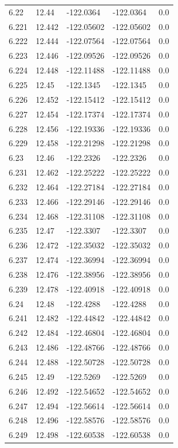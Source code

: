 \begin{tabular}{lllll}
6.22 & 12.44 & -122.0364 & -122.0364 & 0.0 \\
6.221 & 12.442 & -122.05602 & -122.05602 & 0.0 \\
6.222 & 12.444 & -122.07564 & -122.07564 & 0.0 \\
6.223 & 12.446 & -122.09526 & -122.09526 & 0.0 \\
6.224 & 12.448 & -122.11488 & -122.11488 & 0.0 \\
6.225 & 12.45 & -122.1345 & -122.1345 & 0.0 \\
6.226 & 12.452 & -122.15412 & -122.15412 & 0.0 \\
6.227 & 12.454 & -122.17374 & -122.17374 & 0.0 \\
6.228 & 12.456 & -122.19336 & -122.19336 & 0.0 \\
6.229 & 12.458 & -122.21298 & -122.21298 & 0.0 \\
6.23 & 12.46 & -122.2326 & -122.2326 & 0.0 \\
6.231 & 12.462 & -122.25222 & -122.25222 & 0.0 \\
6.232 & 12.464 & -122.27184 & -122.27184 & 0.0 \\
6.233 & 12.466 & -122.29146 & -122.29146 & 0.0 \\
6.234 & 12.468 & -122.31108 & -122.31108 & 0.0 \\
6.235 & 12.47 & -122.3307 & -122.3307 & 0.0 \\
6.236 & 12.472 & -122.35032 & -122.35032 & 0.0 \\
6.237 & 12.474 & -122.36994 & -122.36994 & 0.0 \\
6.238 & 12.476 & -122.38956 & -122.38956 & 0.0 \\
6.239 & 12.478 & -122.40918 & -122.40918 & 0.0 \\
6.24 & 12.48 & -122.4288 & -122.4288 & 0.0 \\
6.241 & 12.482 & -122.44842 & -122.44842 & 0.0 \\
6.242 & 12.484 & -122.46804 & -122.46804 & 0.0 \\
6.243 & 12.486 & -122.48766 & -122.48766 & 0.0 \\
6.244 & 12.488 & -122.50728 & -122.50728 & 0.0 \\
6.245 & 12.49 & -122.5269 & -122.5269 & 0.0 \\
6.246 & 12.492 & -122.54652 & -122.54652 & 0.0 \\
6.247 & 12.494 & -122.56614 & -122.56614 & 0.0 \\
6.248 & 12.496 & -122.58576 & -122.58576 & 0.0 \\
6.249 & 12.498 & -122.60538 & -122.60538 & 0.0 \\

\end{tabular}
